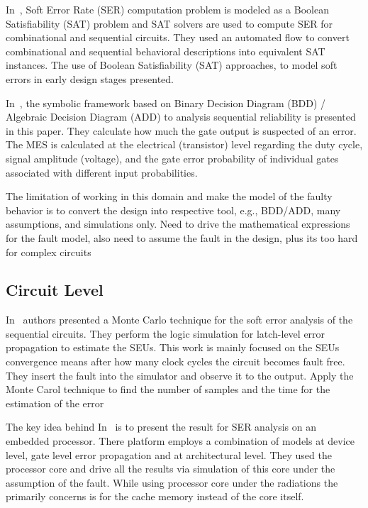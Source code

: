 In~\cite{shazli2011high}, Soft Error Rate (SER) computation problem is modeled as a Boolean
Satisfiability (SAT) problem and SAT solvers are used to compute SER for combinational and
sequential circuits. They used an automated flow to convert combinational and sequential behavioral
descriptions into equivalent SAT instances. The use of Boolean Satisfiability (SAT) approaches, to
model soft errors in early design stages presented.



In~\cite{miskov2007mars}, the symbolic framework based on Binary Decision Diagram (BDD) / Algebraic Decision
Diagram (ADD) to analysis sequential reliability is presented in this paper. They calculate how much the
gate output is suspected of an error. The MES is calculated at the electrical (transistor) level regarding
the duty cycle, signal amplitude (voltage), and the gate error probability of individual gates associated
with different input probabilities. 




The limitation of working in this domain and make the model of the faulty behavior is to convert the design into respective tool, e.g., BDD/ADD, many assumptions, and simulations only. Need to drive the mathematical expressions for the fault model,  also need to assume the fault in the design, plus its too hard for complex circuits


\subsection{Circuit Level}


In~\cite{li2016monte} authors presented a  Monte Carlo technique for the soft error analysis of the sequential
circuits. They perform the logic simulation for latch-level error propagation to estimate the SEUs. This work is mainly focused on the SEUs convergence means after how many clock cycles the circuit becomes fault free.
They insert the fault into the simulator and observe it to the output. Apply the Monte Carol technique
to find the number of samples and the time for the estimation of the error
  
  

  The key idea behind In~\cite{ebrahimi2015comprehensive} is to present the result for SER analysis on an embedded
processor. There platform employs a combination of models at device level, gate level error
propagation and at architectural level. They used the
processor core and drive all the results via simulation of this core under the assumption of the fault. While using processor core under the radiations the primarily concerns is for the cache memory instead
of the core itself.


